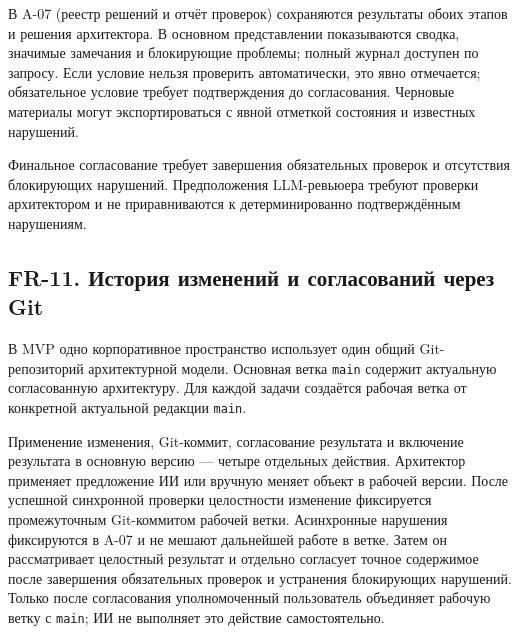 \documentclass[10pt,a4paper]{article}
\begin{document}
В A-07 (реестр решений и отчёт проверок) сохраняются результаты обоих этапов и решения архитектора. В основном представлении показываются сводка, значимые замечания и блокирующие проблемы; полный журнал доступен по запросу. Если условие нельзя проверить автоматически, это явно отмечается; обязательное условие требует подтверждения до согласования. Черновые материалы могут экспортироваться с явной отметкой состояния и известных нарушений.

Финальное согласование требует завершения обязательных проверок и отсутствия блокирующих нарушений. Предположения LLM-ревьюера требуют проверки архитектором и не приравниваются к детерминированно подтверждённым нарушениям.

\subsection{FR-11. История изменений и согласований через Git}\label{fr-11-ux438ux441ux442ux43eux440ux438ux44f-ux438ux437ux43cux435ux43dux435ux43dux438ux439-ux438-ux441ux43eux433ux43bux430ux441ux43eux432ux430ux43dux438ux439-ux447ux435ux440ux435ux437-git}

В MVP одно корпоративное пространство использует один общий Git-репозиторий архитектурной модели. Основная ветка \texttt{main} содержит актуальную согласованную архитектуру. Для каждой задачи создаётся рабочая ветка от конкретной актуальной редакции \texttt{main}.

Применение изменения, Git-коммит, согласование результата и включение результата в основную версию --- четыре отдельных действия. Архитектор применяет предложение ИИ или вручную меняет объект в рабочей версии. После успешной синхронной проверки целостности изменение фиксируется промежуточным Git-коммитом рабочей ветки. Асинхронные нарушения фиксируются в A-07 и не мешают дальнейшей работе в ветке. Затем он рассматривает целостный результат и отдельно согласует точное содержимое после завершения обязательных проверок и устранения блокирующих нарушений. Только после согласования уполномоченный пользователь объединяет рабочую ветку с \texttt{main}; ИИ не выполняет это действие самостоятельно.
\end{document}
